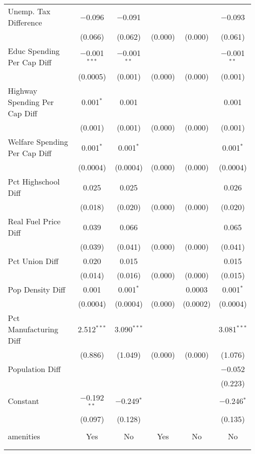 \begin{table}[!htbp]
\begin{tabular}{@{\extracolsep{5pt}}lccccc}
  Unemp. Tax Difference & $-$0.096 & $-$0.091 &  &  & $-$0.093 \\ 
  & (0.066) & (0.062) & (0.000) & (0.000) & (0.061) \\ 
  Educ Spending Per Cap Diff & $-$0.001$^{***}$ & $-$0.001$^{**}$ &  &  & $-$0.001$^{**}$ \\ 
  & (0.0005) & (0.001) & (0.000) & (0.000) & (0.001) \\ 
  Highway Spending Per Cap Diff & 0.001$^{*}$ & 0.001 &  &  & 0.001 \\ 
  & (0.001) & (0.001) & (0.000) & (0.000) & (0.001) \\ 
  Welfare Spending Per Cap Diff & 0.001$^{*}$ & 0.001$^{*}$ &  &  & 0.001$^{*}$ \\ 
  & (0.0004) & (0.0004) & (0.000) & (0.000) & (0.0004) \\ 
  Pct Highschool Diff & 0.025 & 0.025 &  &  & 0.026 \\ 
  & (0.018) & (0.020) & (0.000) & (0.000) & (0.020) \\ 
  Real Fuel Price Diff & 0.039 & 0.066 &  &  & 0.065 \\ 
  & (0.039) & (0.041) & (0.000) & (0.000) & (0.041) \\ 
  Pct Union Diff & 0.020 & 0.015 &  &  & 0.015 \\ 
  & (0.014) & (0.016) & (0.000) & (0.000) & (0.015) \\ 
  Pop Density Diff & 0.001 & 0.001$^{*}$ &  & 0.0003 & 0.001$^{*}$ \\ 
  & (0.0004) & (0.0004) & (0.000) & (0.0002) & (0.0004) \\ 
  Pct Manufacturing Diff & 2.512$^{***}$ & 3.090$^{***}$ &  &  & 3.081$^{***}$ \\ 
  & (0.886) & (1.049) & (0.000) & (0.000) & (1.076) \\ 
  Population Diff &  &  &  &  & $-$0.052 \\ 
  &  &  &  &  & (0.223) \\ 
  Constant & $-$0.192$^{**}$ & $-$0.249$^{*}$ &  &  & $-$0.246$^{*}$ \\ 
  & (0.097) & (0.128) &  &  & (0.135) \\ 
 \hline \\[-1.8ex] 
amenities & Yes & No & Yes & No & No \\ 
\hline \\[-1.8ex] 
\hline 
\hline \\[-1.8ex] 
\end{tabular} 
\end{table} 
